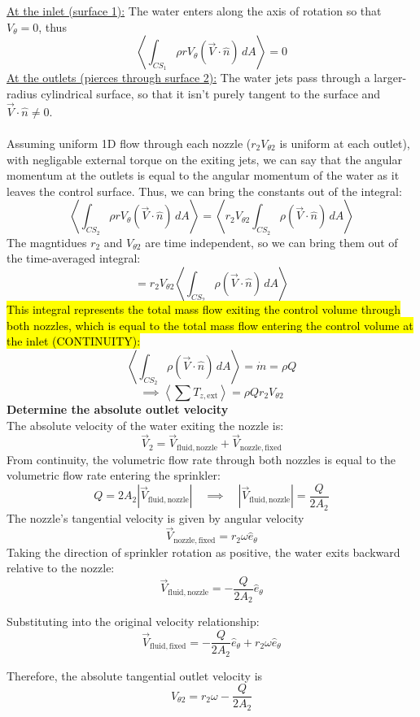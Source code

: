 ﻿\documentclass[12pt]{article}
\begin{document}
\begin{examplebox}
\[\]
\underline{At the inlet (surface 1):} The water enters along the axis of rotation so that $V_\theta=0$, thus
\[
\left\langle\int_{CS_1}\rho rV_\theta(\vec V\cdot\hat n)\,dA\right\rangle=0
\]
\underline{At the outlets (pierces through surface 2):} The water jets pass through a larger-radius cylindrical surface, so that it isn't purely tangent to the surface and $\vec{V}\cdot\hat{n}\neq 0$.\\\\
Assuming uniform 1D flow through each nozzle ($r_2 V_{\theta 2}$ is uniform at each outlet), with negligable external torque on the exiting jets, we can say that the angular momentum at the outlets is equal to the angular momentum of the water as it leaves the control surface. Thus, we can bring the constants out of the integral:
\[
\left\langle\int_{CS_2}\rho rV_\theta(\vec V\cdot\hat n)\,dA\right\rangle
=\left\langle r_2V_{\theta2}\int_{CS_2}\rho(\vec V\cdot\hat n)\,dA\right\rangle
\]
The magntidues $r_2$ and $V_{\theta2}$ are time independent, so we can bring them out of the time-averaged integral:
\[
=r_2V_{\theta2}\left\langle\int_{CS_2}\rho(\vec V\cdot\hat n)\,dA\right\rangle
\]
\newpage
\hl{This integral represents the total mass flow exiting the control volume through both nozzles, which is equal to the total mass flow entering the control volume at the inlet (CONTINUITY):}
\[
\left\langle\int_{CS_2}\rho(\vec V\cdot\hat n)\,dA\right\rangle=\dot m=\rho Q
\]
\[
\implies \boxed{\left\langle\sum T_{z,\mathrm{ext}}\right\rangle=\rho Q r_2V_{\theta2}}
\]
\textbf{Determine the absolute outlet velocity}\\
The absolute velocity of the water exiting the nozzle is:
\[
\vec V_2=\vec V_{\mathrm{fluid,nozzle}}+\vec V_{\mathrm{nozzle,fixed}}
\]
From continuity, the volumetric flow rate through both nozzles is equal to the volumetric flow rate entering the sprinkler:
\[
Q=2A_2|\vec V_{\mathrm{fluid,nozzle}}| \quad\implies \quad |\vec V_{\mathrm{fluid,nozzle}}|=\frac{Q}{2A_2}
\]
The nozzle's tangential velocity is given by angular velocity
\[
\vec V_{\mathrm{nozzle,fixed}}=r_2\omega\hat e_\theta
\]
Taking the direction of sprinkler rotation as positive, the water exits backward relative to the nozzle:
\[
\vec V_{\mathrm{fluid,nozzle}}=-\frac{Q}{2A_2}\hat e_\theta
\]

Substituting into the original velocity relationship:
\[
\vec V_{\mathrm{fluid,fixed}}=-\frac{Q}{2A_2}\hat e_\theta+r_2\omega\hat e_\theta
\]

Therefore, the absolute tangential outlet velocity is
\[
\boxed{V_{\theta2}=r_2\omega-\frac{Q}{2A_2}}
\]


\end{examplebox}
\end{document}
